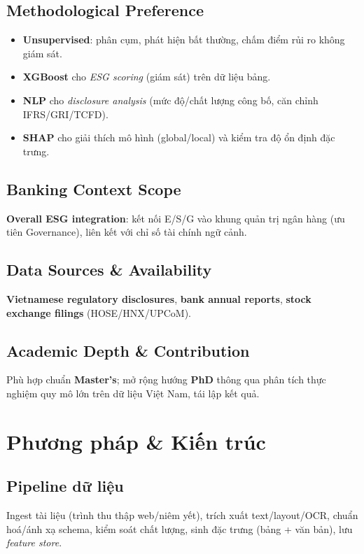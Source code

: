 \documentclass[conference]{IEEEtran}
\begin{document}
\subsection{Methodological Preference}
\begin{itemize}
    \item \textbf{Unsupervised}: phân cụm, phát hiện bất thường, chấm điểm rủi ro không giám sát.
    \item \textbf{XGBoost} cho \textit{ESG scoring} (giám sát) trên dữ liệu bảng.
    \item \textbf{NLP} cho \textit{disclosure analysis} (mức độ/chất lượng công bố, căn chỉnh IFRS/GRI/TCFD).
    \item \textbf{SHAP} cho giải thích mô hình (global/local) và kiểm tra độ ổn định đặc trưng.
\end{itemize}

\subsection{Banking Context Scope}
\textbf{Overall ESG integration}: kết nối E/S/G vào khung quản trị ngân hàng (ưu tiên Governance), liên kết với chỉ số tài chính ngữ cảnh.

\subsection{Data Sources \& Availability}
\textbf{Vietnamese regulatory disclosures}, \textbf{bank annual reports}, \textbf{stock exchange filings} (HOSE/HNX/UPCoM).

\subsection{Academic Depth \& Contribution}
Phù hợp chuẩn \textbf{Master's}; mở rộng hướng \textbf{PhD} thông qua phân tích thực nghiệm quy mô lớn trên dữ liệu Việt Nam, tái lập kết quả.

\section{Phương pháp \& Kiến trúc}
\subsection{Pipeline dữ liệu}
Ingest tài liệu (trình thu thập web/niêm yết), trích xuất text/layout/OCR, chuẩn hoá/ánh xạ schema, kiểm soát chất lượng, sinh đặc trưng (bảng + văn bản), lưu \textit{feature store}.
\end{document}
